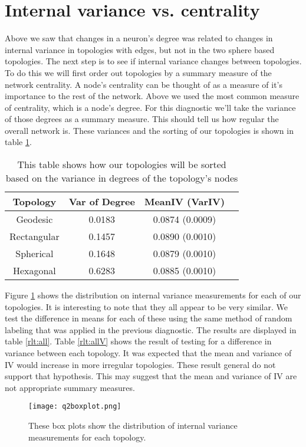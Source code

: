 \section{Internal variance vs. centrality}
\label{rdq2}
Above we saw that changes in a neuron's degree was related to changes in
internal variance in topologies with edges, but not in the two sphere based
topologies. The next step is to see if internal variance changes between
topologies.  To do this we will first order out topologies by a summary
measure of the network centrality.  A node's centrality can be thought of as a
measure of it's importance to the rest of the network. Above we used the most
common measure of centrality, which is a node's degree.  For this diagnostic
we'll take the variance of those degrees as a summary measure.  This should
tell us how regular the overall network is.  These variances and the sorting
of our topologies is shown in table \ref{vardeg}.

\begin{table}[hbt]
\centering
\caption{This table shows how our topologies will be sorted based on the
variance in degrees of the topology's nodes}
\label{vardeg}
\begin{tabular}{|c|c|c|c|}
\hline
Topology & Var of Degree & MeanIV (VarIV)\\
\hline
Geodesic & 0.0183 & 0.0874 (0.0009)\\
Rectangular & 0.1457 & 0.0890 (0.0010)\\
Spherical & 0.1648 & 0.0879 (0.0010)\\
Hexagonal & 0.6283 & 0.0885 (0.0010)\\
\hline
\end{tabular}
\end{table}

Figure \ref{q2boxplot} shows the distribution on internal variance
measurements for each of our topologies.  It is interesting to note that
they all appear to be very similar. We test the difference in means for
each of these using the same method of random labeling that was applied in the
previous diagnostic. The results are displayed in table \ref{rlt:all}. Table
\ref{rlt:allV} shows the result of testing for a difference in variance
between each topology.  It was expected that the mean and variance of IV would
increase in more irregular topologies.  These result general do not support
that hypothesis. This may suggest that the mean and variance of IV are not
appropriate summary measures.

\begin{figure}[hbt]
\centering
\texttt{[image: q2boxplot.png]}
\caption{These box plots show the distribution of internal variance measurements
for each topology.}
\label{q2boxplot}
\end{figure}


